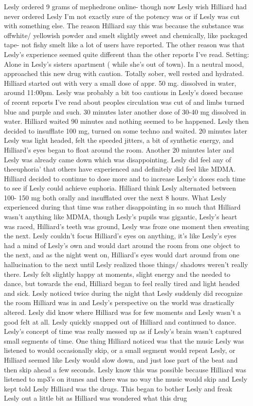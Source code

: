 \documentclass[12pt]{book}
\begin{document}
Lesly ordered 9 grams of mephedrone online- though now Lesly wish Hilliard had never ordered Lesly I'm not exactly sure of the potency was or if Lesly was cut with something else. The reason Hilliard say this was because the substance was offwhite/ yellowish powder and smelt slightly sweet and chemically, like packaged tape- not fishy smelt like a lot of users have reported. The other reason was that Lesly's experience seemed quite different than the other reports I've read. Setting: Alone in Lesly's sisters apartment ( while she's out of town). In a neutral mood, approached this new drug with caution. Totally sober, well rested and hydrated. Hilliard started out with very a small dose of appr. 50 mg. dissolved in water, around 11:00pm. Lesly was probably a bit too cautious in Lesly's dosed because of recent reports I've read about peoples circulation was cut of and limbs turned blue and purple and such. 30 minutes later another dose of 30-40 mg dissolved in water. Hilliard waited 90 minutes and nothing seemed to be happened. Lesly then decided to insufflate 100 mg, turned on some techno and waited. 20 minutes later Lesly was light headed, felt the speeded jitters, a bit of synthetic energy, and Hilliard's eyes began to float around the room. Another 20 minutes later and Lesly was already came down which was disappointing. Lesly did feel any of theeuphoria' that others have experienced and definitely did feel like MDMA. Hilliard decided to continue to dose more and to increase Lesly's doses each time to see if Lesly could achieve euphoria. Hilliard think Lesly alternated between 100- 150 mg both orally and insufflated over the next 8 hours. What Lesly experienced during that time was rather disappointing in so much that Hilliard wasn't anything like MDMA, though Lesly's pupils was gigantic, Lesly's heart was raced, Hilliard's teeth was ground, Lesly was froze one moment then sweating the next. Lesly couldn't focus Hilliard's eyes on anything, it's like Lesly's eyes had a mind of Lesly's own and would dart around the room from one object to the next, and as the night went on, Hilliard's eyes would dart around from one hallucination to the next until Lesly realized those things/ shadows weren't really there. Lesly felt slightly happy at moments, slight energy and the needed to dance, but towards the end, Hilliard began to feel really tired and light headed and sick. Lesly noticed twice during the night that Lesly suddenly did recognize the room Hilliard was in and Lesly's perspective on the world was drastically altered. Lesly did know where Hilliard was for few moments and Lesly wasn't a good felt at all. Lesly quickly snapped out of Hilliard and continued to dance. Lesly's concept of time was really messed up as if Lesly's brain wasn't captured small segments of time. One thing Hilliard noticed was that the music Lesly was listened to would occasionally skip, or a small segment would repeat Lesly, or Hilliard seemed like Lesly would slow down, and just lose part of the beat and then skip ahead a few seconds. Lesly know this was possible because Hilliard was listened to mp3's on itunes and there was no way the music would skip and Lesly kept told Lesly Hilliard was the drugs. This began to bother Lesly and freak Lesly out a little bit as Hilliard was wondered what this drug 
\end{document}
